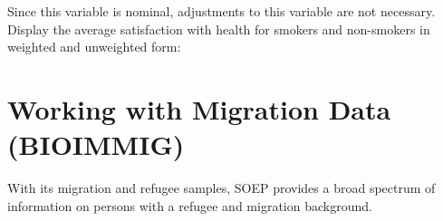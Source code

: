 \documentclass[letterpaper,10pt,openany,onesideH,english]{sphinxmanual}
\begin{document}
%
\begin{sphinxVerbatim}[commandchars=\\\{\},numbers=left,firstnumber=1,stepnumber=1]
	  \PYG{p}{[}\PYG{p}{]} 
\end{sphinxVerbatim}

\begin{figure}[H]
\centering

\noindent{}
\end{figure}


Since this variable is nominal, adjustments to this variable are not necessary. Display the average satisfaction with health for smokers and non-smokers in weighted and unweighted form:

%
\begin{sphinxVerbatim}[commandchars=\\\{\},numbers=left,firstnumber=1,stepnumber=1]
   

	  
\end{sphinxVerbatim}

\begin{figure}[H]
\centering

\noindent{}
\end{figure}

%
\begin{sphinxVerbatim}[commandchars=\\\{\},numbers=left,firstnumber=1,stepnumber=1]
	  \PYG{p}{[}\PYG{p}{]}   
\end{sphinxVerbatim}

\begin{figure}[H]
\centering

\noindent{}
\end{figure}


\section{Working with Migration Data (BIOIMMIG)}
\label{\detokenize{Working with SOEP Data/index:working-with-migration-data-bioimmig}}
With its migration and refugee samples, SOEP provides a broad spectrum of information on persons with a refugee and migration background.
\end{document}
